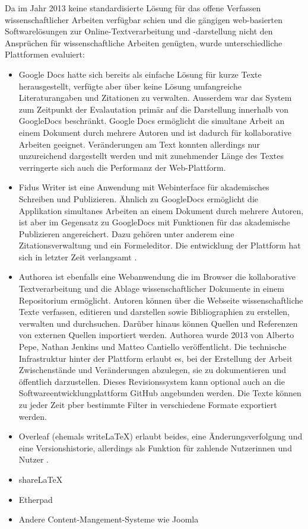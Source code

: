 Da im Jahr 2013 keine standardisierte Lösung für das offene Verfassen wissenschaftlicher Arbeiten verfügbar schien und die gängigen web-basierten Softwarelösungen zur Online-Textverarbeitung und -darstellung nicht den Ansprüchen für wissenschaftliche Arbeiten genügten, wurde unterschiedliche Plattformen evaluiert:
\begin{itemize}
\item Google Docs hatte sich bereits als einfache Lösung für kurze Texte herausgestellt, verfügte aber über keine Lösung umfangreiche Literaturangaben und Zitationen zu verwalten. Ausserdem war das System zum Zeitpunkt der Evalautation primär auf die Darstellung innerhalb von GoogleDocs beschränkt. Google Docs ermöglicht die simultane Arbeit an einem Dokument durch mehrere Autoren und ist dadurch für kollaborative Arbeiten geeignet. Veränderungen am Text konnten allerdings nur unzureichend dargestellt werden und mit zunehmender Länge des Textes verringerte sich auch die Performanz der Web-Plattform.
\item Fidus Writer ist eine Anwendung mit Webinterface für akademisches Schreiben und Publizieren. Ähnlich zu GoogleDocs ermöglicht die Applikation simultanes Arbeiten an einem Dokument durch mehrere Autoren, ist aber im Gegensatz zu GoogleDocs mit Funktionen für das akademische Publizieren angereichert. Dazu gehören unter anderem eine Zitationsverwaltung und ein Formeleditor. Die entwicklung der Plattform hat sich in letzter Zeit verlangsamt \cite{fidus_2015}.
\item Authorea ist ebenfalls eine Webanwendung die im Browser die kollaborative Textverarbeitung  und die Ablage wissenschaftlicher Dokumente in einem Repositorium ermöglicht. Autoren können über die Webseite wissenschaftliche Texte verfassen, editieren und darstellen sowie Bibliographien zu erstellen, verwalten und durchsuchen. Darüber hinaus können Quellen und Referenzen von externen Quellen importiert werden. Authorea wurde 2013 von Alberto Pepe, Nathan Jenkins und Matteo Cantiello veröffentlicht. Die technische Infrastruktur hinter der Plattform erlaubt es, bei der Erstellung der Arbeit Zwischenstände und Veränderungen abzulegen, sie zu dokumentieren und öffentlich darzustellen. Dieses Revisionssystem kann optional auch an die Softwareentwicklungplattform GitHub angebunden werden. Die Texte können zu jeder Zeit pber bestimmte Filter in verschiedene Formate exportiert werden.
\item Overleaf (ehemals writeLaTeX) erlaubt beides, eine Änderungsverfolgung und eine Versionshistorie, allerdings als Funktion für zahlende Nutzerinnen und Nutzer \cite{Perkel_2014}.
\item shareLaTeX
\item Etherpad
\item Andere Content-Mangement-Systeme wie Joomla
\end{itemize}

